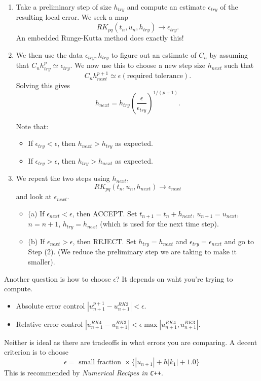 \documentclass{article}
\begin{document}
\begin{enumerate}
    \item Take a preliminary step of size $h_{try}$ and compute an estimate $\epsilon_{try}$ of the resulting local error. We seek a map
    \[RK_{pq} (t_n, u_n, h_{try}) \to \epsilon_{try}.\]
    An embedded Runge-Kutta method does exactly this!
    \item We then use the data $\epsilon_{try}, h_{try}$ to figure out an estimate of $C_n$ by assuming that $C_n h^p_{try} \simeq \epsilon_{try}$. We now use this to choose a new step size $h_{next}$ such that
    \[C_n h^{p+1}_{next} \simeq \epsilon (\text{required tolerance}).\]
    Solving this gives
    \[h_{next} = h_{try} (\frac{\epsilon}{\epsilon_{try}})^{1/(p+1)}.\]
\begin{remark}
    Note that:
    \begin{itemize}
        \item If $\epsilon_{try} < \epsilon$, then $h_{next} > h_{try}$ as expected.
        \item If $\epsilon_{try} > \epsilon$, then $h_{try} > h_{next}$ as expected.
    \end{itemize}
\end{remark}
    \item We repeat the two steps using $h_{next}$,
    \[RK_{pq}(t_n, u_n, h_{next}) \to \epsilon_{next}\]
    and look at $\epsilon_{next}$.
    \begin{itemize}
        \item (a) If $\epsilon_{next} < \epsilon$, then ACCEPT. Set $t_{n+1} = t_n + h_{next}$, $u_{n+1} = u_{next}$, $n = n + 1$, $h_{try} = h_{next}$ (which is used for the next time step).
        \item (b) If $\epsilon_{next} > \epsilon$, then REJECT. Set $h_{try} = h_{next}$ and $\epsilon_{try} = \epsilon_{next}$ and go to Step (2). (We reduce the preliminary step we are taking to make it smaller). 
    \end{itemize}
\end{enumerate}

Another question is how to choose $\epsilon$? It depends on waht you're trying to compute.
\begin{itemize}
    \item Absolute error control $|u^{p+1}_{n+1} - u^{RK3}_{n+1}| < \epsilon$.
    \item Relative error control $|u^{RK4}_{n+1} - u^{RK3}_{n+1}| < \epsilon \max |u_{n+1}^{RK4}, u_{n+1}^{RK3}|$.
\end{itemize}
Neither is ideal as there are tradeoffs in what errors you are comparing. A decent criterion is to choose
\[\epsilon = \text{ small fraction } \times \{|u_{n+1}| + h |k_1| + 1.0\}\]
This is recommended by \textit{Numerical Recipes in \texttt{C++}}.\\
\end{document}
